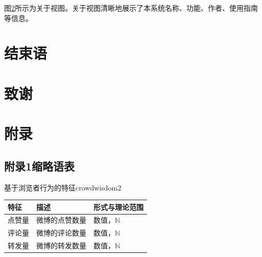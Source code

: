 \documentclass[a4paper,AutoFakeBold,oneside,12pt]{book}
\begin{document}
图\ref{}所示为关于视图。关于视图清晰地展示了本系统名称、功能、作者、使用指南等信息。


\chapter{结束语}


\begin{nopagenumber}
	\clearpage{}
	

	\clearpage
	\chapter{致\qquad{}谢}
	\normalsize\thankwords

	\setcounter{figure}{0}
	\renewcommand{\thefigure}{~附-\arabic{figure}~}
	\setcounter{equation}{0}
	\renewcommand{\theequation}{~附-\arabic{equation}~}
	\setcounter{table}{0}
	\renewcommand{\thetable}{~附-\arabic{table}~}
	\setcounter{lstlisting}{0}
	\makeatletter
	\renewcommand \thelstlisting
	{附-\@arabic\c@lstlisting}
	\makeatother


	\chapter*{附\qquad{}录}

	\section*{附录1\quad{}缩略语表}

	\begin{bupttable}{基于浏览者行为的特征}{crowdwisdom2}
		\begin{tabular}{l|l|l}
			\hline \textbf{特征} & \textbf{描述}  & \textbf{形式与理论范围} \\
			\hline 点赞量        & 微博的点赞数量 & 数值，$\mathbb{N}$      \\
			\hline 评论量        & 微博的评论数量 & 数值，$\mathbb{N}$      \\
			\hline 转发量        & 微博的转发数量 & 数值，$\mathbb{N}$      \\
			\hline
		\end{tabular}
	\end{bupttable}


\end{nopagenumber}
\end{document}
